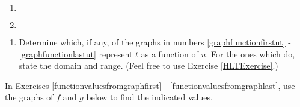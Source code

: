 \documentclass{ximera}
\begin{document}
\begin{enumerate}

\item  $~$  \label{graphfunctionfirstut3}


%  
%  

\item  $~$ \label{graphfunctionlastut}



\end{enumerate}


\begin{enumerate}

\item  Determine which, if any, of the graphs in numbers \ref{graphfunctionfirstut} - \ref{graphfunctionlastut} represent $t$ as a function of $u$.  For the ones which do, state the domain and range.   (Feel free to use Exercise \ref{HLTExercise}.)

\end{enumerate}



In Exercises \ref{functionvaluesfromgraphfirst} - \ref{functionvaluesfromgraphlast}, use the graphs of $f$ and $g$ below to find the indicated values.
\end{document}
